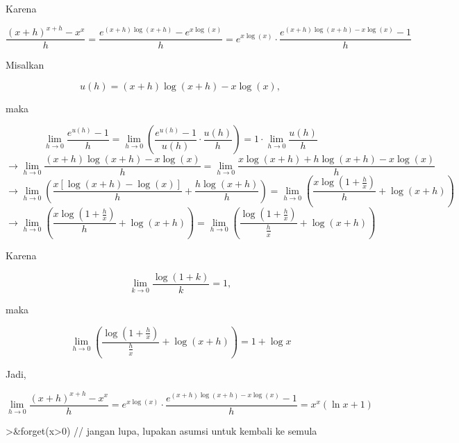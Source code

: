 \documentclass[a4paper,11pt,oneside,enabledeprecatedfontcommands]{scrbook}
\newenvironment{eulernotebook}{}{}
\newenvironment{eulercomment}{\par\medskip\noindent}{\par\medskip}
\newenvironment{eulerformula}{}{}
\begin{document}
\begin{eulernotebook}
\begin{eulercomment}
Karena
\end{eulercomment}
\begin{eulerformula}
\[
\frac{(x+h)^{x+h}-x^x}{h}= \frac{e^{(x+h)\log(x+h)}-e^{x\log(x)}}{h}=e^{x\log(x)} \cdot \frac{e^{(x+h)\log(x+h)-x\log(x)}-1}{h}
\]
\end{eulerformula}
\begin{eulercomment}
Misalkan
\end{eulercomment}
\begin{eulerformula}
\[
u(h)=(x+h)\log(x+h)-x\log(x),
\]
\end{eulerformula}
\begin{eulercomment}
maka
\end{eulercomment}
\begin{eulerformula}
\[
\lim_{h\to 0} \frac{e^{u(h)}-1}{h}= \lim_{h\to 0} \left(\frac{e^{u(h)}-1}{u(h)} \cdot \frac{u(h)}{h}\right)= 1 \cdot \lim_{h\to 0}\frac{u(h)}{h}
\]
\end{eulerformula}
\begin{eulerformula}
\[
\rightarrow \lim_{h\to 0} \frac{(x+h)\log(x+h)-x\log(x)}{h}= \lim_{h\to 0} \frac{x\log(x+h)+h\log(x+h)-x\log(x)}{h}
\]
\end{eulerformula}
\begin{eulerformula}
\[
\rightarrow \lim_{h\to 0} \left(\frac{x\left[\log(x+h)-\log(x)\right]}{h}+\frac{h\log(x+h)}{h}\right) = \lim_{h\to 0} \left(\frac{x\log\left(1+\frac{h}{x}\right)}{h}+\log(x+h)\right)
\]
\end{eulerformula}
\begin{eulerformula}
\[
\rightarrow \lim_{h \to 0} \left( \frac{x \log\left(1 + \frac{h}{x}\right)}{h} + \log(x+h) \right) = \lim_{h \to 0} \left( \frac{\log\left(1 + \frac{h}{x}\right)}{\frac{h}{x}} + \log(x+h) \right)
\]
\end{eulerformula}
\begin{eulercomment}
Karena
\end{eulercomment}
\begin{eulerformula}
\[
\lim_{k \to 0} \frac{\log(1+k)}{k} = 1,
\]
\end{eulerformula}
\begin{eulercomment}
maka 
\end{eulercomment}
\begin{eulerformula}
\[
\lim_{h \to 0} \left( \frac{\log\left(1 + \frac{h}{x}\right)}{\frac{h}{x}} + \log(x+h) \right) = 1 + \log x
\]
\end{eulerformula}
\begin{eulercomment}
Jadi, 
\end{eulercomment}
\begin{eulerformula}
\[
\lim_{h \to 0} \frac{(x+h)^{x+h} - x^x}{h} = e^{x\log (x)} \cdot \frac{e^{(x+h)\log(x+h) - x\log (x)} - 1}{h}= x^x (\ln x + 1)
\]
\end{eulerformula}
\begin{eulerprompt}
>&forget(x>0) // jangan lupa, lupakan asumsi untuk kembali ke semula
\end{eulerprompt}
\begin{euleroutput}
  

\end{euleroutput}
\end{eulernotebook}
\end{document}

